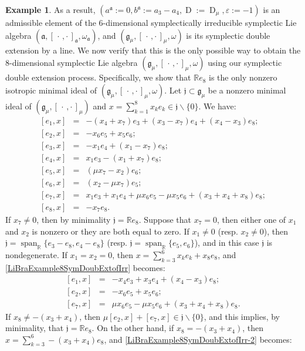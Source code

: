 \documentclass[final,1p,times,nopreprintline]{elsarticle}
\theoremstyle{definition}
\newtheorem{example}{Example}[section]
\numberwithin{equation}{section}
\newcommand{\rel}{\mathbb{R}}
\newcommand{\w}{\omega}
\newcommand{\g}{\mathfrak{g}}
\newcommand{\ai}{\mathfrak{a}}
\newcommand{\Span}{\operatorname{span}}
\numberwithin{equation}{section}
\newcommand{\D}{\operatorname{D}}
\newcommand{\cro}{[\,\cdot\,,\cdot\,]}
\newcommand{\jj}{\mathfrak{j}}
\begin{document}
\begin{example}
As a result, $(a^{\ai}:=0,b^{\ai}:=a_3-a_4,\D:=\D_\mu,\varepsilon:=-1)$ is an admissible element of the $6$-dimensional symplectically irreducible symplectic Lie algebra  $(\ai,\cro_{\ai},\w_{\ai})$, and $(\g_\mu,\cro_\mu,\w)$ is its symplectic double extension by a line. We now verify that this is the only possible way to obtain the $8$-dimensional symplectic Lie algebra $(\g_\mu,\cro_\mu,\w)$ using our symplectic double extension process. Specifically, we show that $\rel e_8$ is the only nonzero isotropic minimal ideal of $(\g_\mu, \cro_\mu, \w)$. Let $\jj\subset\g_\mu$ be a nonzero minimal ideal of $(\g_\mu,\cro_\mu)$ and $x=\sum_{k=1}^8x_ke_k\in\jj\backslash\{0\}$. We have:
\begin{eqnarray}\label{LiBraExample8SymDoubExtofIrr}
\left[e_1,x\right]&=&-(x_4+x_7)e_3+(x_3-x_7)e_4+(x_4-x_3)e_8;\nonumber\\
\left[e_2,x\right]&=&-x_6e_5+x_5e_6;\nonumber\\
\left[e_3,x\right]&=&-x_1e_4+(x_1-x_7)e_8;\nonumber\\
\left[e_4,x\right]&=&x_1e_3-(x_1+x_7)e_8;\nonumber\\
\left[e_5,x\right]&=&(\mu x_7-x_2)e_6;\\
\left[e_6,x\right]&=&(x_2-\mu x_7)e_5;\nonumber\\
\left[e_7,x\right]&=&x_1e_3+x_1e_4+\mu x_6e_5-\mu x_5e_6+(x_3+x_4+x_8)e_8;\nonumber\\
\left[e_8,x\right]&=&-x_7e_8.\nonumber
\end{eqnarray}  
If $x_7\neq 0$, then by minimality $\jj=\rel e_8$. Suppose that $x_7=0$, then either one of $x_1$ and $x_2$ is nonzero or they are both equal to zero. If $x_1\neq 0$ (resp. $x_2\neq 0$), then $\jj=\Span_\rel\{e_3-e_8,e_4-e_8\}$ (resp. $\jj=\Span_\rel\{e_5,e_6\}$), and in this case $\jj$ is nondegenerate. If $x_1=x_2=0$, then $x=\sum_{k=3}^6x_ke_k+x_8e_8$, and \eqref{LiBraExample8SymDoubExtofIrr} becomes:
\begin{eqnarray}\label{LiBraExample8SymDoubExtofIrr-2}
\left[e_1,x\right]&=&-x_4e_3+x_3e_4+(x_4-x_3)e_8;\nonumber\\
	\left[e_2,x\right]&=&-x_6e_5+x_5e_6;\\
	\left[e_7,x\right]&=&\mu x_6e_5-\mu x_5e_6+(x_3+x_4+x_8)e_8.\nonumber
\end{eqnarray} 
If $x_8\neq -(x_3+x_4)$, then $\mu[e_2,x]+[e_7,x]\in\jj\backslash\{0\}$, and this implies, by minimality, that $\jj=\rel e_8$. On the other hand, if $x_8=-(x_3+x_4)$, then $x=\sum_{k=3}^6-(x_3+x_4)e_8$, and \eqref{LiBraExample8SymDoubExtofIrr-2} becomes:

\end{example}
\end{document}
